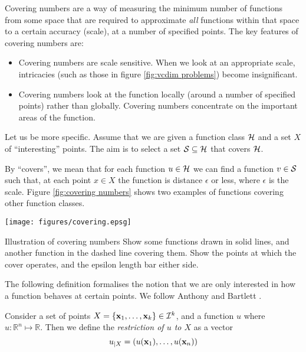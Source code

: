 Covering numbers are a way of measuring the minimum number of
functions from some space that are required to approximate \emph{all}
functions within that space to a certain accuracy (scale), at a number
of specified points.  The key features of covering numbers are:
%
\begin{itemize}
\item	Covering numbers are scale sensitive.  When we look at an
	appropriate scale, intricacies (such as those in figure
	\ref{fig:vcdim problems}) become insignificant.
\item	Covering numbers look at the function locally (around a number
	of specified points) rather than globally.  Covering
	numbers concentrate on the important areas of the function.
\end{itemize}

Let us be more specific.  Assume that we are given a function class
$\mathcal{H}$ and a set $X$ of ``interesting'' points.  The aim is to select
a set $\mathcal{S} \subseteq \mathcal{H}$ that covers $\mathcal{H}$.

By ``covers'', we  mean that for each function $u \in \mathcal{H}$ we can
find a function $v \in \mathcal{S}$ such that, at each point $x \in X$ the
function is distance $\epsilon$ or less, where $\epsilon$ is the
scale.  Figure \ref{fig:covering numbers} shows two examples of
functions covering other function classes.

\begin{linefigure}
\begin{center}
\texttt{[image: figures/covering.epsg]}
\end{center}
\begin{capt}{Illustration of covering numbers}
Show some functions drawn in solid lines, and another function in the
dashed line covering them.  Show the points at which the cover
operates, and the epsilon length bar either side.
\end{capt}
\end{linefigure}

The following definition formalises the notion that we are only
interested in how a function behaves at certain points.  We follow
Anthony and Bartlett \cite{Anthony98}.

\begin{definition}
\label{def:restriction}
Consider a set of points $X = \{\mathbf{x}_1, \ldots, \mathbf{x}_k\} \in \mathcal{I}^k$,
and a function $u$ where $u : \mathbb{R}^n \mapsto \mathbb{R}$.  Then
we define the \emph{restriction of $u$ to $X$} as a vector
%
\begin{equation}
u_{|X} = (u(\mathbf{x}_1), \ldots, u(\mathbf{x}_n))
\end{equation}
\end{definition}

